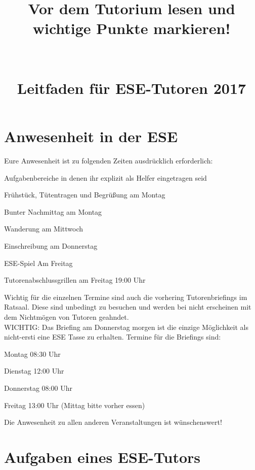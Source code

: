 \documentclass[a4paper,12pt]{report}
\begin{document}
\title{\huge{\textbf{Vor dem Tutorium lesen und wichtige Punkte markieren!}}\\\ \\\ \\{Leitfaden für ESE-Tutoren 2017}}
\date{}
\author{}
\maketitle

\section*{Anwesenheit in der ESE}
Eure Anwesenheit ist zu folgenden Zeiten ausdrücklich erforderlich:
\begin{itemize*}
	\item Aufgabenbereiche in denen ihr explizit als Helfer eingetragen seid
	\item Frühstück, Tütentragen und Begrüßung am Montag
	\item Bunter Nachmittag am Montag
	\item Wanderung am Mittwoch
	\item Einschreibung am Donnerstag
	\item ESE-Spiel Am Freitag
	\item Tutorenabschlussgrillen am Freitag 19:00 Uhr
\end{itemize*}
Wichtig für die einzelnen Termine sind auch die vorhering Tutorenbriefings im Ratsaal. Diese sind unbedingt zu besuchen und werden bei nicht erscheinen mit dem Nichtmögen von Tutoren geahndet.\\
WICHTIG: Das Briefing am Donnerstag morgen ist die einzige Möglichkeit als nicht-ersti eine ESE Tasse zu erhalten.
Termine für die Briefings sind:
\begin{itemize*}
	\item Montag   		08:30 Uhr
	\item Dienstag 		12:00 Uhr
	\item Donnerstag	08:00 Uhr
	\item Freitag		13:00 Uhr (Mittag bitte vorher essen)
\end{itemize*}

Die Anwesenheit zu allen anderen Veranstaltungen ist wünschenswert!

\section*{Aufgaben eines ESE-Tutors}
\end{document}
